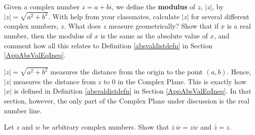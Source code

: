 \documentclass{ximera}
\begin{document}
\begin{problem}\label{cmpgeoalgexlast}
Given a complex number $z = a+bi$, we define the \textbf{modulus} of $z$, $|z|$, by $|z| = \sqrt{a^2+b^2}$.  With help from your classmates, calculate $|z|$ for several different complex numbers, $z$.  What does $z$ measure geometrically?  Show that if $x$ is a real number, then the modulus of $x$ is the same as the absolute value of $x$, and comment how all this relates to Definition \ref{absvaldistdefn} in Section \ref{AppAbsValEqIneq}.

\begin{solution}
$|z| = \sqrt{a^2+b^2}$ measures the distance from the origin to the point $(a,b)$.  Hence, $|z|$ measures the distance from $z$ to $0$ in the Complex Plane.  This is exactly how $|x|$ is defined in Definition \ref{absvaldistdefn} in Section \ref{AppAbsValEqIneq}.  In that section, however,  the only part of the Complex Plane under discussion is the real number line.
\end{solution}
\end{problem}

\begin{problem}\label{zbarexercise}
Let $z$ and $w$ be arbitrary complex numbers.  Show that  $\overline{z} \, \overline{w}  = \overline{zw}$ and $\overline{\overline{z}} = z$.  
\end{problem}  
\end{document}
